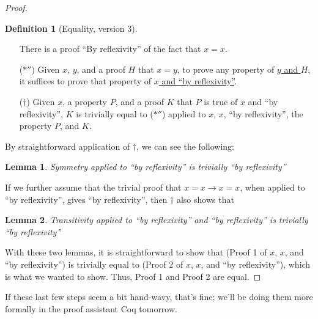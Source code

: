 \documentclass{article}
\newtheorem*{lem*}{Lemma}
\theoremstyle{definition}
\newtheorem*{defn*}{Definition}
\begin{document}
\begin{proof}
{\setlength{\parskip}{0pt}%
\begin{defn*}[Equality, version 3]
$\left.\right.$\\
\begin{enumerate}
\item[] There is a proof ``By reflexivity'' of the fact that $x = x$.
\item[($\ast''$)] Given $x$, $y$, and a proof \underline{$H$} that $x = y$, to prove any property of \underline{$y$ and $H$}, it suffices to prove that property of \underline{$x$ and ``by reflexivity''}.
\item[($\dagger$)] Given $x$, a property $P$, and a proof $K$ that $P$ is true of $x$ and ``by reflexivity'', $K$ is trivially equal to ($\ast''$) applied to $x$, $x$, ``by reflexivity'', the property $P$, and $K$.
\end{enumerate}
\end{defn*}
}

By straightforward application of $\dagger$, we can see the following:
\begin{lem*}
Symmetry applied to ``by reflexivity'' is trivially ``by reflexivity''
\end{lem*}

If we further assume that the trivial proof that $x = x \to x = x$, when applied to ``by reflexivity'', gives ``by reflexivity'', then $\dagger$ also shows that
\begin{lem*}
Transitivity applied to ``by reflexivity'' and ``by reflexivity'' is trivially ``by reflexivity''
\end{lem*}

With these two lemmas, it is straightforward to show that (Proof 1 of $x$, $x$, and ``by reflexivity'') is trivially equal to (Proof 2 of $x$, $x$, and ``by reflexivity''), which is what we wanted to show.  Thus, Proof 1 and Proof 2 are equal.
\end{proof}

If these last few steps seem a bit hand-wavy, that's fine; we'll be doing them more formally in the proof assistant Coq tomorrow.
\end{document}
